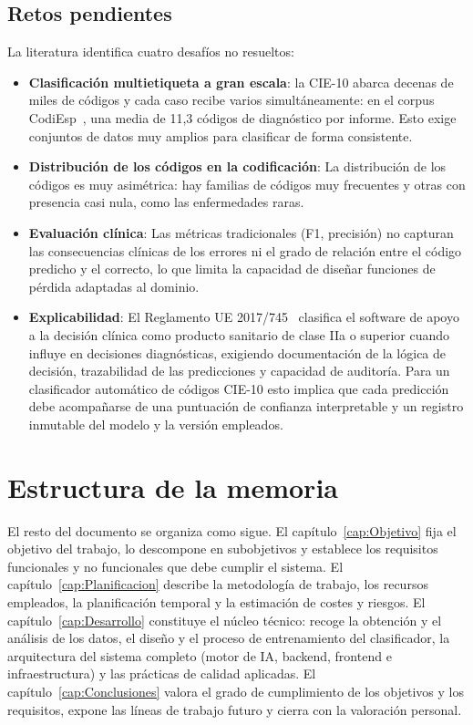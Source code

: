 \subsection{Retos pendientes}
La literatura identifica cuatro desafíos no resueltos:
\begin{itemize}
\item \textbf{Clasificación multietiqueta a gran escala}: la CIE-10 abarca decenas de miles de códigos y cada caso recibe varios simultáneamente: en el corpus CodiEsp~\cite{miranda2020}, una media de 11,3 códigos de diagnóstico por informe. Esto exige conjuntos de datos muy amplios para clasificar de forma consistente.
\item \textbf{Distribución de los códigos en la codificación}: La distribución de los códigos es muy asimétrica: hay familias de códigos muy frecuentes y otras con presencia casi nula, como las enfermedades raras.
\item \textbf{Evaluación clínica}: Las métricas tradicionales (F1, precisión) no capturan las consecuencias clínicas de los errores ni el grado de relación entre el código predicho y el correcto, lo que limita la capacidad de diseñar funciones de pérdida adaptadas al dominio.
\item \textbf{Explicabilidad}: El Reglamento UE 2017/745~\cite{eu2017745} clasifica el software de apoyo a la decisión clínica como producto sanitario de clase IIa o superior cuando influye en decisiones diagnósticas, exigiendo documentación de la lógica de decisión, trazabilidad de las predicciones y capacidad de auditoría. Para un clasificador automático de códigos CIE-10 esto implica que cada predicción debe acompañarse de una puntuación de confianza interpretable y un registro inmutable del modelo y la versión empleados.
\end{itemize}

\section{Estructura de la memoria}

El resto del documento se organiza como sigue. El capítulo~\ref{cap:Objetivo} fija el objetivo del trabajo, lo descompone en subobjetivos y establece los requisitos funcionales y no funcionales que debe cumplir el sistema. El capítulo~\ref{cap:Planificacion} describe la metodología de trabajo, los recursos empleados, la planificación temporal y la estimación de costes y riesgos. El capítulo~\ref{cap:Desarrollo} constituye el núcleo técnico: recoge la obtención y el análisis de los datos, el diseño y el proceso de entrenamiento del clasificador, la arquitectura del sistema completo (motor de IA, backend, frontend e infraestructura) y las prácticas de calidad aplicadas. El capítulo~\ref{cap:Conclusiones} valora el grado de cumplimiento de los objetivos y los requisitos, expone las líneas de trabajo futuro y cierra con la valoración personal.

